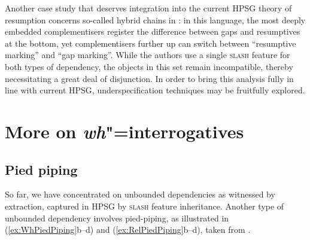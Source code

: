 \documentclass[output=paper
,notxmath 
 	        ,biblatex
                ,babelshorthands
                ,newtxmath
                ,draftmode
                ,colorlinks, citecolor=brown
]{langscibook}
\begin{document}
Another case study that deserves integration into the current HPSG
theory of resumption concerns so-called hybrid chains in 
\citep{assmann10:_does_chain_hybrid_irish_suppor}: in this language,
the most deeply embedded complementisers register the difference
between gaps and resumptives at the bottom, yet complementisers
further up can switch between ``resumptive marking'' and ``gap
marking''. While the authors use a single \textsc{slash} feature for
both types of dependency, the objects in this set remain incompatible,
thereby necessitating a great deal of disjunction. In order to bring
this analysis fully in line with current HPSG, underspecification
techniques may be fruitfully explored.



\section{More on \emph{wh}"=interrogatives}
\label{sec:UDC:MoreWh}

\subsection{Pied piping}

So far, we have concentrated on unbounded dependencies as witnessed by
extraction, captured in HPSG by \textsc{slash} feature
inheritance. Another type of unbounded dependency involves
pied-piping, as illustrated in (\ref{ex:WhPiedPiping}b--d) and
(\ref{ex:RelPiedPiping}b--d), taken from \citet[184]{Ginzburg:Sag:01}.

\begin{exe}
  \ex \label{ex:WhPiedPiping}
  \begin{xlist}
  \end{xlist}
\end{exe}
\end{document}
